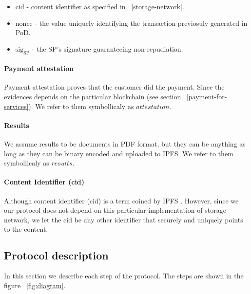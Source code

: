 \documentclass{ieeeaccess}
\begin{document}
\begin{itemize}

\item
  \(\mathrm{cid}\) - content identifier as specified in ~\ref{storage-network}.
\item
  \(\mathrm{nonce}\) - the value uniquely identifying the transaction
  previosuly generated in PoD.
\item
  \(\mathrm{sig}_\mathrm{SP}\) - the SP's signature guaranteeing
  non-repudiation.
\end{itemize}

\paragraph{Payment attestation}\label{payment-attestation}

Payment attestation proves that the customer did the payment. Since the
evidences depends on the particular blockchain (see section ~\ref{payment-for-services}). We refer to them symbollicaly as
\(attestation\).

\paragraph{Results}\label{results}

We assume results to be documents in PDF format, but they can be
anything as long as they can be binary encoded and uploaded to IPFS. We
refer to them symbollicaly as \(results\).

\paragraph{Content Identifier (cid)}\label{content-identifier-cid}

Although content identifier (cid) is a term coined by IPFS
\cite{Contenta59}. However, since we our protocol does not depend on
this particular implementation of storage network, we let the cid be any
other identifier that securely and uniquely points to the content.

\subsection{Protocol description}\label{protocol-description}

In this section we describe each step of the protocol. The steps are
shown in the figure ~\ref{fig:diagram}.
\end{document}
